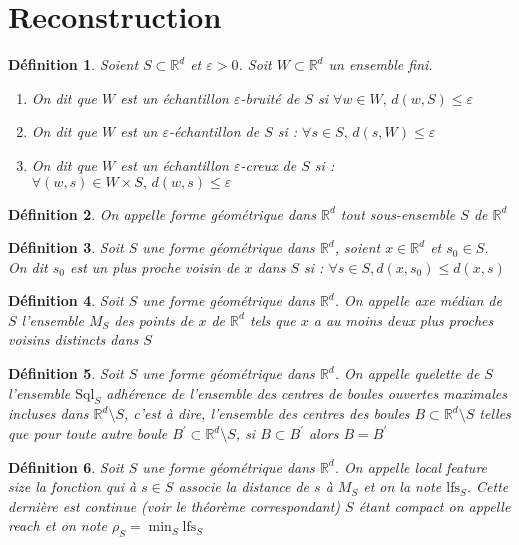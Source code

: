\documentclass{report}
\newcommand{\R}{\mathbb{R}}
\newcommand{\Sql}{\mathrm{Sql}}
\newcommand{\eps}{\varepsilon}
\newtheorem{definition}{Définition}
\theoremstyle{remark}
\begin{document}
\section{Reconstruction}
\begin{definition}
	 Soient $S \subset \R^d$ et $\eps>0$. Soit $W\subset \R^d$ un ensemble fini.
	\begin{enumerate}
	\item On dit que $W$ est un échantillon \textnormal{$\eps$-bruité} de $S$ si $\forall w \in W,\, d(w, S) \leq \eps$
	\item On dit que $W$ est un \textnormal{$\eps$-échantillon} de $S$ si : $\forall s \in S,\, d(s, W) \leq \eps$
	\item On dit que $W$ est un échantillon \textnormal{$\eps$-creux} de $S$ si : $\forall (w, s) \in W\times S,\, d(w, s) \leq \eps$
	\end{enumerate}
\end{definition}

\begin{definition}
	On appelle \textnormal{forme géométrique dans $\R^d$} tout sous-ensemble $S$ de $\R^d$
\end{definition}

\begin{definition}
	Soit $S$ une forme géométrique dans $\R^d$, soient $x\in\R^d$ et $s_0\in S$. On dit $s_0$ est un \textnormal{plus proche voisin} de $x$ dans $S$ si : $\forall s\in S, d(x, s_0) \leq d(x, s)$
\end{definition}
	 
\begin{definition}
	Soit $S$ une forme géométrique dans $\R^d$. On appelle \textnormal{axe médian} de $S$ l'ensemble $M_S$ des points de $x$ de $\R^d$ tels que $x$ a au moins deux plus proches voisins distincts dans $S$
\end{definition}

\begin{definition}
	Soit $S$ une forme géométrique dans $\R^d$. On appelle \textnormal{quelette} de $S$ l'ensemble $\Sql_S$ adhérence de l'ensemble des centres de boules ouvertes maximales incluses dans $\R^d\setminus S$, c'est à dire, l'ensemble des centres des boules $B\subset\R^d\setminus S$ telles que pour toute autre boule $B^\prime\subset\R^d\setminus S$, si $B\subset B^\prime$ alors $B=B^\prime$
\end{definition}

\begin{definition}
	Soit $S$ une forme géométrique dans $\R^d$. On appelle \textnormal{local feature size} la fonction qui à $s\in S$ associe la distance de $s$ à $M_S$ et on la note $\mathrm{lfs}_S$. Cette dernière est continue (voir le théorème correspondant) $S$ étant compact on appelle \textnormal{reach} et on note $\rho_S = \min_S\mathrm{lfs}_S$
\end{definition}
\end{document}
